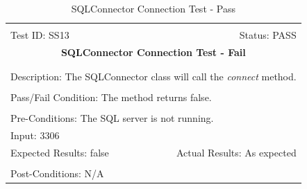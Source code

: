 \documentclass[11pt]{article}
\begin{document}
\begin{center}
\begin{table}[H]
\begin{tabular}{|l r|}\hline&\\[-2mm]
	Test ID: SS13	&Status: PASS\\[-3mm]
	\multicolumn{2}{|c|}{\textbf{\large{SQLConnector Connection Test - Fail}}}\\&\\\hline&\\[-3mm]
	\multicolumn{2}{|p{\textwidth}|}{Description: The SQLConnector class will call the \textit{connect} method.}\\[1mm]\hline&\\[-3mm]
	\multicolumn{2}{|p{\textwidth}|}{Pass/Fail Condition: The method returns false.}\\[1mm]\hline&\\[-3mm]
	\multicolumn{2}{|p{\textwidth}|}{Pre-Conditions: The SQL server is not running.}\\[4mm]
	\multicolumn{2}{|p{\textwidth}|}{Input: 3306}\\[2mm]\hline
	\multicolumn{1}{|p{0.49\textwidth}}{Expected Results: false}	&\multicolumn{1}{|p{0.45\textwidth}|}{Actual Results: As expected}\\\hline&\\[-3mm]
	\multicolumn{2}{|p{\textwidth}|}{Post-Conditions: N/A}\\\hline
\end{tabular}
\caption{SQLConnector Connection Test - Pass}
\end{table}
\end{center}
\end{document}
